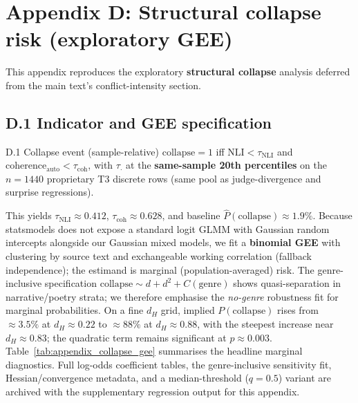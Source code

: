 \section{Appendix D: Structural collapse risk (exploratory GEE)}
\label{app:collapse}

This appendix reproduces the exploratory \textbf{structural collapse} analysis deferred from the main text's conflict-intensity section.

\subsection{D.1 Indicator and GEE specification}
\begin{DefnBox}{D.1 Collapse event (sample-relative)}
$\mathrm{collapse}{=}1$ iff $\mathrm{NLI}{<}\tau_{\mathrm{NLI}}$ and $\mathrm{coherence}_{\mathrm{auto}}{<}\tau_{\mathrm{coh}}$, with $\tau_{\cdot}$ at the \textbf{same-sample 20th percentiles} on the $n{=}1440$ proprietary T3 discrete rows (same pool as judge-divergence and surprise regressions).
\end{DefnBox}
\noindent
This yields $\tau_{\mathrm{NLI}}{\approx}0.412$, $\tau_{\mathrm{coh}}{\approx}0.628$, and baseline $\hat P(\mathrm{collapse}){\approx}1.9\%$.
Because statsmodels does not expose a standard logit GLMM with Gaussian random intercepts alongside our Gaussian mixed models, we fit a \textbf{binomial GEE} with clustering by source text and exchangeable working correlation (fallback independence); the estimand is marginal (population-averaged) risk.
The genre-inclusive specification $\mathrm{collapse}{\sim}d{+}d^2{+}C(\mathrm{genre})$ shows quasi-separation in narrative/poetry strata; we therefore emphasise the \emph{no-genre} robustness fit for marginal probabilities.
On a fine $d_H$ grid, implied $P(\mathrm{collapse})$ rises from $\approx 3.5\%$ at $d_H{\approx}0.22$ to $\approx 88\%$ at $d_H{\approx}0.88$, with the steepest increase near $d_H{\approx}0.83$; the quadratic term remains significant at $p{\approx}0.003$.
Table~\ref{tab:appendix_collapse_gee} summarises the headline marginal diagnostics.
Full log-odds coefficient tables, the genre-inclusive sensitivity fit, Hessian/convergence metadata, and a median-threshold ($q{=}0.5$) variant are archived with the supplementary regression output for this appendix.

